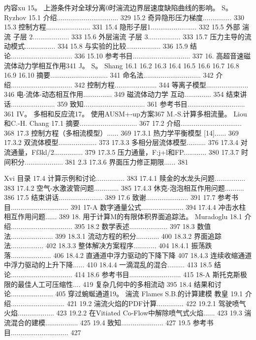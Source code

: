 \documentclass[UTF8,11pt,a4paper,openany,fontset=fandol]{ctexbook}
\begin{document}
内容xu 15。 上游条件对全球分离0时湍流边界层速度缺陷曲线的影响。 S。 Ryzhov 15.1 介绍................................ 329 15.2 奇异隐形压力梯度............... 330 15.3 控制方程....................... 331 15.4 隐形子层1........................ 332 15.5 外部 湍流 子层 2................... 333 15.6 外层湍流 子层 3................. 333 15.7 压力主导的流动模式................ 334 15.8 与实验的比较.................. 336 15.9 结论................................ 336 15.10 参考书目.............................. 337 16. 高超音速磁流体动力学相互作用341 J。 S。 Shang 16.1 16.2 16.3 16.4 16.5 16.6 16.7 16.8 16.9 16.10 摘要.............................. 341 命名法.............................. 342 介绍................................ 342 控制方程...................... 344 等离子模型...................... 346 电-流体-动态相互作用............... 349 磁流体动力学 互动.............. 354 结束讲话....................... 359 致知................................ 361 参考书目.............................. 361 IV。 多相和反应流17。 使用AUSM+-up方案367 M.-S.计算多相流量。 Liou和C.-H. Chang 17.1 摘要.............................. 367 17.2 介绍................................ 368 17.3 控制方程（多相流模型）...... 369 17.3.1 热力学平衡模型 [14]...... 369 17.3.2 双流体模型.................... 373 17.3.3 多相分层流体模型.......... 376 17.3.4 对流通量，Ff3kl/2............... 379 17.3.5 压力通量，F:j+l和FP............ 380 17.3.7 时间积分.................... 381 2.3 17.3.6 界面压力修正期限...... 381

Xvi 目录 17.4 计算示例和讨论............... 383 17.4.1 赎金的水龙头问题................ 383 17.4.2 空气-水激波管问题............. 385 17.4.3 休克-泡泡相互作用问题.......... 386 17.5 结束讲话....................... 389 17.6 致谢...................... 391 17.7 参考书目.............................. 391 17-A 数字通量公式...................... 394 17.4.4 冲击水柱相互作用问题...... 389 18. 用于计算M的有限体积界面追踪法。 Muradoglu 18.1 介绍................................ 395 18.2 数学表述.................... 397 18.3 数值法...................... 399 18.3.1 流动方程的积分............ 400 18.3.2 界面追踪法................. 402 18.3.3 整体解决方案程序............ 404 18.4.1 振荡跌落..................... 406 18.4.2 直通道中浮力驱动的下降下降 407 18.4.3 连续收缩通道中浮力驱动的上升下降...... 410 18.4.4 一滴混乱的混合......... 413 18.5 结论................................ 414 18.6 参考书目........................... 415 18-A 斯托克斯极限的最佳人工可压缩性.... 419 复杂几何中的多相流动 395 18.4 结果和讨论...................... 405 穿过蜿蜒通道19。 湍流 Flames S.B.的计算建模 教皇 19.1 介绍............................ 421 19.2 湍流火焰的PDF计算.............. 422 19.2.1 驾驶喷气火焰................... 423 19.2.2 在Vitiated Co-Flow中解除喷气式火焰...... 423 19.3 湍流混合的建模................. 425 19.4 致知...................... 427 19.5 参考书目.............................. 427
\end{document}
